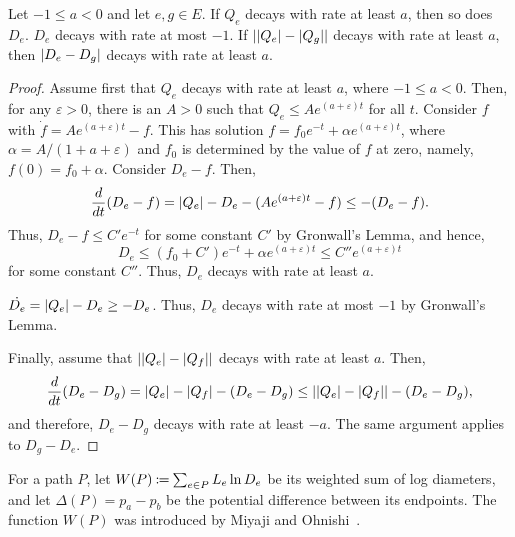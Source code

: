 \documentclass[11pt,a4paper]{article}
\begin{document}
\begin{lemma}\label{decay of Q implies decay of D}\label{decay of Q implies
decay of D, a = 1}\label{similar decay of Q implies similar decay of D}
Let $-1 \le a < 0$ and let $e,g \in E$. If $Q_e$ decays with rate at least $a$, then so does $D_e$. $D_e$
decays with rate at most $-1$. If $| | Q_e | - | Q_g | |$ decays with
rate at least $a$, then $| D_e - D_g |$ decays
with rate at least $a$. \end{lemma}
\begin{proof} Assume first that $Q_e$ decays with rate at least $a$, where $-1
\le a < 0$. Then, for any $\varepsilon > 0$, there is an $A > 0$ such that $Q_e \le
A e^{(a + \varepsilon)t}$ for all $t$. Consider $f$ with $\dot{f} = A e^{(a +
\varepsilon)t} - f$. This has solution 
$f = f_0 e^{-t} + \alpha e^{(a + \varepsilon)t}$, where $\alpha = A/(1 + a + \varepsilon)$ and $f_0$
is determined by the value of $f$ at zero, namely, $f(0) = f_0 + \alpha$. 
Consider $D_e - f$. Then,
\[ \frac{d}{dt} ( D_e  - f) = | Q_e | - D_e - (A e^{(a  + \varepsilon)t} - f) \le - (D_e - f) .\]
Thus, $D_e - f \le C' e^{-t}$ for some constant $C'$ by Gronwall's Lemma, and hence,
\[   D_e \le (f_0 + C') e^{-t} + \alpha e^{(a + \varepsilon)t} \le C'' e^{(a
+ \varepsilon)t} \]
for some constant $C''$. Thus, $D_e$ decays with rate at least $a$. \smallskip

$\dot{D_e} = | Q_e | - D_e \ge -D_e$. Thus, $D_e$ decays with rate at most
$-1$ by Gronwall's Lemma. \smallskip

Finally, assume that $| | Q_e | - | Q_f | |$ decays with rate at least
$a$. Then,
\[ \frac{d}{dt} (D_e - D_g) = | Q_e | - | Q_f | - (D_e - D_g) \le | 
| Q_e | - | Q_f | | - (D_e - D_g),\]
and therefore, $D_e - D_g$ decays with rate at least $-a$. The same argument
applies to $D_g - D_e$. 
\end{proof}



For a path $P$, let $W(P) \define \sum_{e \in P} L_e \ln D_e$ be its weighted
sum of log diameters, and let $\Delta(P) = p_a - p_b$ be the potential
difference between its endpoints. The function $W(P)$ was introduced by Miyaji
and Ohnishi~\cite{Miyaji-Ohnish07,Miyaji-Ohnishi}.


\end{document}
